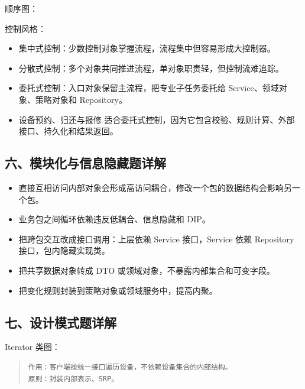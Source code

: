 \documentclass[UTF8,zihao=-4]{ctexart}
\begin{document}
顺序图：





控制风格：


\begin{itemize}
\item 集中式控制：少数控制对象掌握流程，流程集中但容易形成大控制器。
\item 分散式控制：多个对象共同推进流程，单对象职责轻，但控制流难追踪。
\item 委托式控制：入口对象保留主流程，把专业子任务委托给 Service、领域对象、策略对象和 Repository。
\item 设备预约、归还与报修 适合委托式控制，因为它包含校验、规则计算、外部接口、持久化和结果返回。
\end{itemize}



\subsection{六、模块化与信息隐藏题详解}


\begin{itemize}
\item 直接互相访问内部对象会形成高访问耦合，修改一个包的数据结构会影响另一个包。
\item 业务包之间循环依赖违反低耦合、信息隐藏和 DIP。
\item 把跨包交互改成接口调用：上层依赖 Service 接口，Service 依赖 Repository 接口，包内隐藏实现类。
\item 把共享数据对象转成 DTO 或领域对象，不暴露内部集合和可变字段。
\item 把变化规则封装到策略对象或领域服务中，提高内聚。
\end{itemize}



\subsection{七、设计模式题详解}


Iterator 类图：

\ExamIteratorDiagram

\begin{quote}
\footnotesize
\begin{verbatim}
作用：客户端按统一接口遍历设备，不依赖设备集合的内部结构。
原则：封装内部表示、SRP。
\end{verbatim}
\end{quote}
\end{document}
